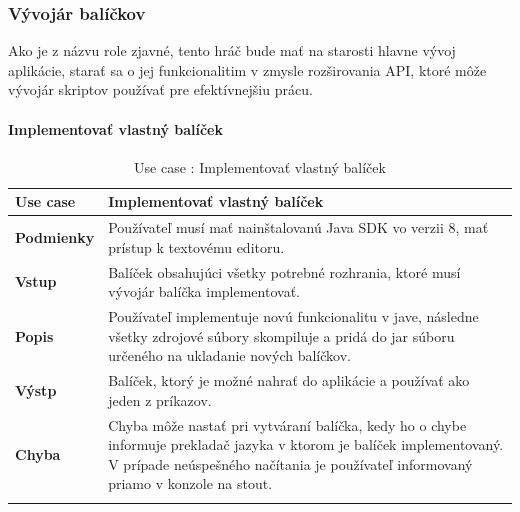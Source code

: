 \subsubsection{Vývojár balíčkov}
\indent Ako je z názvu role zjavné, tento hráč bude mať na starosti hlavne vývoj aplikácie, starať sa o jej funkcionalitim v zmysle rozširovania API, ktoré môže vývojár skriptov používať pre efektívnejšiu prácu.
\paragraph{Implementovať vlastný balíček}
\begin{center}
	\begin{longtable}{|p{2.5cm}|p{14cm}|}
		
			\hline
			\textbf{Use case} & Implementovať vlastný balíček \\ 
			\hline
			\textbf{Podmienky} & Používateľ musí mať nainštalovanú Java SDK vo verzii 8, mať prístup k textovému editoru.  \\ 
			\hline
			\textbf{Vstup} & Balíček obsahujúci všetky potrebné rozhrania, ktoré musí vývojár balíčka implementovať.\\
			\hline
			\textbf{Popis} & Používateľ implementuje novú funkcionalitu v jave, následne všetky zdrojové súbory skompiluje a pridá do jar súboru určeného na ukladanie nových balíčkov.\\ 
			\hline
			\textbf{Výstp} & Balíček, ktorý je možné nahrať do aplikácie a používať ako jeden z príkazov.\\
			\hline
			\textbf{Chyba} & Chyba môže nastať pri vytváraní balíčka, kedy ho o chybe informuje prekladač jazyka v ktorom je balíček implementovaný. V prípade neúspešného načítania je používateľ informovaný priamo v konzole na stout.\\
			\hline
		\caption{Use case : Implementovať vlastný balíček}
		\label{table:1}
		
	\end{longtable}
\end{center}

